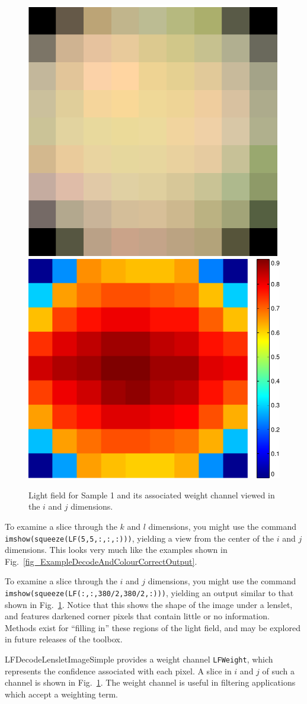 \documentclass[onecolumn]{article}
\newcommand{\SupFunction}[1]{{\small #1}}
\newcommand{\SymbolText}[1]{\texttt{\small #1}}
\begin{document}
\begin{figure}[tbh]
	\centering
	\includegraphics[height=0.45\textwidth]{Figs/STSlice}
	\includegraphics[height=0.45\textwidth]{Figs/WeightSTSlice}
	\caption{Light field for Sample 1 and its associated weight channel viewed in the $i$ and $j$ dimensions.}
	\label{fig_STSlice}
\end{figure}

To examine a slice through the $k$ and $l$ dimensions, you might use the command \SymbolText{imshow(squeeze(LF(5,5,:,:,:)))}, yielding a view from the center of the $i$ and $j$ dimensions. This looks very much like the examples shown in Fig.~\ref{fig_ExampleDecodeAndColourCorrectOutput}.

To examine a slice through the $i$ and $j$ dimensions, you might use the command \SymbolText{imshow(squeeze(LF(:,:,380/2,380/2,:)))}, yielding an output similar to that shown in Fig.~\ref{fig_STSlice}. Notice that this shows the shape of the image under a lenslet, and features darkened corner pixels that contain little or no information. Methods exist for ``filling in'' these regions of the light field, and may be explored in future releases of the toolbox.

\SupFunction{LFDecodeLensletImageSimple} provides a weight channel \SymbolText{LFWeight}, which represents the confidence associated with each pixel. A slice in $i$ and $j$ of such a channel is shown in Fig.~\ref{fig_STSlice}. The weight channel is useful in filtering applications which accept a weighting term.
\end{document}
